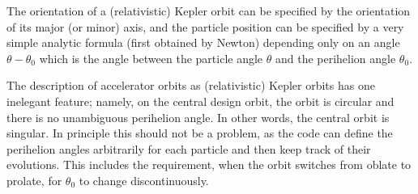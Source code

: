\documentclass[]{article}
\begin{document}
The orientation of a (relativistic) Kepler orbit can be specified by
the orientation of its major (or minor) axis, and the particle position
can be specified by a very simple analytic formula (first obtained
by Newton) depending only on an angle $\theta-\theta_0$ which is the angle between
the particle angle $\theta$ and the perihelion angle $\theta_0$.
  
The description of accelerator orbits as (relativistic) Kepler orbits
has one inelegant feature; namely, on the central design orbit, the orbit is
circular and there is no unambiguous perihelion angle. In other words,
the central orbit is singular. In principle this
should not be a problem, as the code can define the perihelion angles
arbitrarily for each particle and then keep track of their evolutions.
This includes the requirement, when the orbit switches from oblate 
to prolate, for $\theta_0$ to change discontinuously. 
\end{document}
